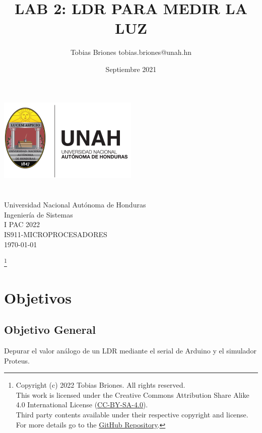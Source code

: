 \documentclass{article}
\title{LAB 2: LDR PARA MEDIR LA LUZ}
\author{Tobias Briones \bigbreak tobias.briones@unah.hn}
\date{Septiembre 2021}
\newcommand\blfootnote[1]{
    \begingroup
    \renewcommand\thefootnote{}\footnote{#1}
    \addtocounter{footnote}{-1}
    \endgroup
}
\begin{document}
    \makeatletter
    \begin{titlepage}
        \begin{center}
            \includegraphics[width=0.3\linewidth]{images/logo-unah.png}\\[4ex]
            {\huge \bfseries \@title
            \vspace{1cm}}\\[2ex]
            {\LARGE \@author}\\[50ex]

            {\large
            Universidad Nacional Autónoma de Honduras\\
            Ingeniería de Sistemas\\
            I PAC 2022\\
            IS911-MICROPROCESADORES
            }\\[2ex]

            {\large \today}
        \end{center}
    \end{titlepage}
    \makeatother
    \thispagestyle{empty}
    \newpage

    \blfootnote{
        Copyright (c) 2022 Tobias Briones. All rights reserved. \\
        This work is licensed under the Creative Commons Attribution Share Alike 4.0 International License (\href{https://spdx.org/licenses/CC-BY-SA-4.0}{CC-BY-SA-4.0}). \\
        Third party contents available under their respective copyright and license.\\
        For more details go to the \href{https://github.com/tobiasbriones/cp-unah-is911-microprocessors}{GitHub Repository}.}

    \section{Objetivos}

    \subsection{Objetivo General}

    Depurar el valor análogo de un LDR mediante el serial de Arduino y el simulador Proteus.
\end{document}
